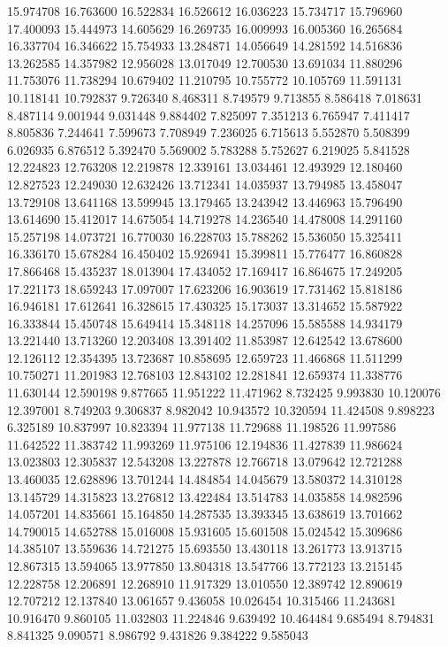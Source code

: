 15.974708
16.763600
16.522834
16.526612
16.036223
15.734717
15.796960
17.400093
15.444973
14.605629
16.269735
16.009993
16.005360
16.265684
16.337704
16.346622
15.754933
13.284871
14.056649
14.281592
14.516836
13.262585
14.357982
12.956028
13.017049
12.700530
13.691034
11.880296
11.753076
11.738294
10.679402
11.210795
10.755772
10.105769
11.591131
10.118141
10.792837
9.726340
8.468311
8.749579
9.713855
8.586418
7.018631
8.487114
9.001944
9.031448
9.884402
7.825097
7.351213
6.765947
7.411417
8.805836
7.244641
7.599673
7.708949
7.236025
6.715613
5.552870
5.508399
6.026935
6.876512
5.392470
5.569002
5.783288
5.752627
6.219025
5.841528
12.224823
12.763208
12.219878
12.339161
13.034461
12.493929
12.180460
12.827523
12.249030
12.632426
13.712341
14.035937
13.794985
13.458047
13.729108
13.641168
13.599945
13.179465
13.243942
13.446963
15.796490
13.614690
15.412017
14.675054
14.719278
14.236540
14.478008
14.291160
15.257198
14.073721
16.770030
16.228703
15.788262
15.536050
15.325411
16.336170
15.678284
16.450402
15.926941
15.399811
15.776477
16.860828
17.866468
15.435237
18.013904
17.434052
17.169417
16.864675
17.249205
17.221173
18.659243
17.097007
17.623206
16.903619
17.731462
15.818186
16.946181
17.612641
16.328615
17.430325
15.173037
13.314652
15.587922
16.333844
15.450748
15.649414
15.348118
14.257096
15.585588
14.934179
13.221440
13.713260
12.203408
13.391402
11.853987
12.642542
13.678600
12.126112
12.354395
13.723687
10.858695
12.659723
11.466868
11.511299
10.750271
11.201983
12.768103
12.843102
12.281841
12.659374
11.338776
11.630144
12.590198
9.877665
11.951222
11.471962
8.732425
9.993830
10.120076
12.397001
8.749203
9.306837
8.982042
10.943572
10.320594
11.424508
9.898223
6.325189
10.837997
10.823394
11.977138
11.729688
11.198526
11.997586
11.642522
11.383742
11.993269
11.975106
12.194836
11.427839
11.986624
13.023803
12.305837
12.543208
13.227878
12.766718
13.079642
12.721288
13.460035
12.628896
13.701244
14.484854
14.045679
13.580372
14.310128
13.145729
14.315823
13.276812
13.422484
13.514783
14.035858
14.982596
14.057201
14.835661
15.164850
14.287535
13.393345
13.638619
13.701662
14.790015
14.652788
15.016008
15.931605
15.601508
15.024542
15.309686
14.385107
13.559636
14.721275
15.693550
13.430118
13.261773
13.913715
12.867315
13.594065
13.977850
13.804318
13.547766
13.772123
13.215145
12.228758
12.206891
12.268910
11.917329
13.010550
12.389742
12.890619
12.707212
12.137840
13.061657
9.436058
10.026454
10.315466
11.243681
10.916470
9.860105
11.032803
11.224846
9.639492
10.464484
9.685494
8.794831
8.841325
9.090571
8.986792
9.431826
9.384222
9.585043
